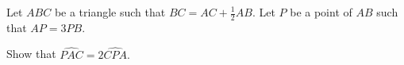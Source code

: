Let $ABC$ be a triangle such that $BC=AC+\frac{1}{2}AB$. Let $P$ be a point of $AB$ such that $AP=3PB$.

Show that $\widehat{PAC} = 2 \widehat{CPA}.$